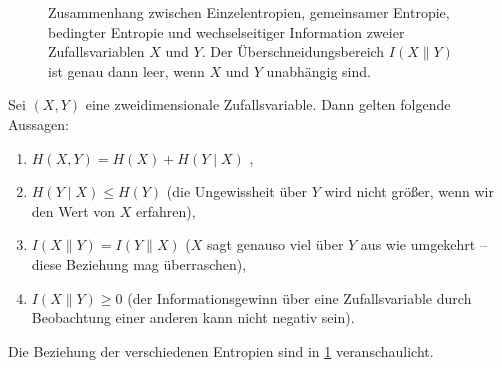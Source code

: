 \begin{figure}
  \centering
  \caption{Zusammenhang zwischen Einzelentropien, gemeinsamer Entropie, bedingter Entropie und wechselseitiger Information zweier Zufallsvariablen $X$ und $Y$. Der Überschneidungsbereich $I(X∥Y)$ ist genau dann leer, wenn $X$ und $Y$ unabhängig sind.}
  \label{fig:conditionalEntropy}
\end{figure}

\begin{lemma}\label{lem:conditionalEntropy}
  Sei $(X, Y)$ eine zweidimensionale Zufallsvariable. Dann gelten folgende Aussagen:
  \begin{enumerate}
    \item $H(X, Y) = H(X) + H(Y∣X)$ \label{lem:conditionalEntropy-a},
    \item $H(Y∣X) ≤ H(Y)$ (die Ungewissheit über $Y$ wird nicht größer, wenn wir den Wert von $X$ erfahren)\label{lem:conditionalEntropy-b},
    \item $I(X∥Y) = I(Y∥X)$ ($X$ sagt genauso viel über $Y$ aus wie umgekehrt – diese Beziehung mag überraschen),
    \item $I(X∥Y) ≥ 0$ (der Informationsgewinn über eine Zufallsvariable durch Beobachtung einer anderen kann nicht negativ sein).
  \end{enumerate}
  Die Beziehung der verschiedenen Entropien sind in \cref{fig:conditionalEntropy} veranschaulicht.
\end{lemma}

